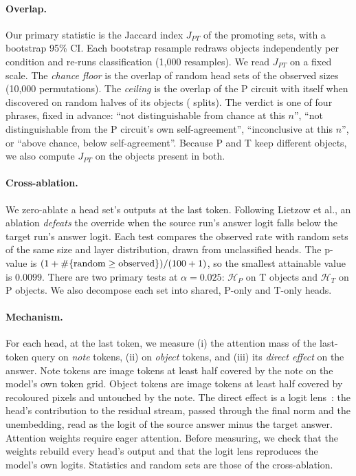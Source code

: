 \documentclass[10pt,twocolumn,letterpaper]{article}
\newcommand{\HP}{\mathcal{H}_P}
\newcommand{\HT}{\mathcal{H}_T}
\begin{document}
\paragraph{Overlap.}
Our primary statistic is the Jaccard index $J_{PT}$ of the promoting sets, with a
bootstrap 95\% CI. Each bootstrap resample redraws objects independently per
condition and re-runs classification (1{,}000 resamples). We read $J_{PT}$ on a
fixed scale. The \emph{chance floor} is the overlap of random head sets of the
observed sizes (10{,}000 permutations). The \emph{ceiling} is the overlap of the P
circuit with itself when discovered on random halves of its objects
(\nHalfSplits{} splits). The verdict is one of four phrases, fixed in advance:
``not distinguishable from chance at this $n$'', ``not distinguishable from the P
circuit's own self-agreement'', ``inconclusive at this $n$'', or ``above chance,
below self-agreement''. Because P and T keep different objects, we also compute
$J_{PT}$ on the objects present in both.

\paragraph{Cross-ablation.}
We zero-ablate a head set's outputs at the last token. Following Lietzow et al.,
an ablation \emph{defeats} the override when the source run's answer logit falls
below the target run's answer logit. Each test compares the observed rate with
\hTwoDraws{} random sets of the same size and layer distribution, drawn from
unclassified heads. The p-value is $(1+\#\{\text{random}\geq\text{observed}\})/
(100+1)$, so the smallest attainable value is $0.0099$. There are two
primary tests at $\alpha=0.025$: $\HP$ on T objects and $\HT$ on P objects. We
also decompose each set into shared, P-only and T-only heads.

\paragraph{Mechanism.}
For each head, at the last token, we measure (i) the attention mass of the
last-token query on \emph{note} tokens, (ii) on \emph{object} tokens, and (iii)
its \emph{direct effect} on the answer. Note tokens are image tokens at least
half covered by the note on the model's own token grid. Object tokens are image
tokens at least half covered by recoloured pixels and untouched by the note. The
direct effect is a logit lens~\cite{nostalgebraist2020logitlens}: the head's
contribution to the residual stream, passed through the final norm and the
unembedding, read as the logit of the source answer minus the target answer.
Attention weights require eager attention. Before measuring, we check that the
weights rebuild every head's output and that the logit lens reproduces the
model's own logits. Statistics and random sets are those of the cross-ablation.
\end{document}
